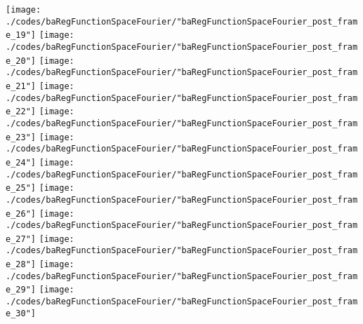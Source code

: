 \begin{frame}{\insertsection}
\begin{center}
{\begin{animateinline}{15}
				 \texttt{[image: ./codes/baRegFunctionSpaceFourier/"baRegFunctionSpaceFourier\_post\_frame\_19"]}\newframe
				 \texttt{[image: ./codes/baRegFunctionSpaceFourier/"baRegFunctionSpaceFourier\_post\_frame\_20"]}\newframe
				 \texttt{[image: ./codes/baRegFunctionSpaceFourier/"baRegFunctionSpaceFourier\_post\_frame\_21"]}\newframe
				 \texttt{[image: ./codes/baRegFunctionSpaceFourier/"baRegFunctionSpaceFourier\_post\_frame\_22"]}\newframe
				 \texttt{[image: ./codes/baRegFunctionSpaceFourier/"baRegFunctionSpaceFourier\_post\_frame\_23"]}\newframe
				 \texttt{[image: ./codes/baRegFunctionSpaceFourier/"baRegFunctionSpaceFourier\_post\_frame\_24"]}\newframe
				 \texttt{[image: ./codes/baRegFunctionSpaceFourier/"baRegFunctionSpaceFourier\_post\_frame\_25"]}\newframe
				 \texttt{[image: ./codes/baRegFunctionSpaceFourier/"baRegFunctionSpaceFourier\_post\_frame\_26"]}\newframe
				 \texttt{[image: ./codes/baRegFunctionSpaceFourier/"baRegFunctionSpaceFourier\_post\_frame\_27"]}\newframe
				 \texttt{[image: ./codes/baRegFunctionSpaceFourier/"baRegFunctionSpaceFourier\_post\_frame\_28"]}\newframe
				 \texttt{[image: ./codes/baRegFunctionSpaceFourier/"baRegFunctionSpaceFourier\_post\_frame\_29"]}\newframe
				 \texttt{[image: ./codes/baRegFunctionSpaceFourier/"baRegFunctionSpaceFourier\_post\_frame\_30"]}
			 \end{animateinline}
			}
	\end{center}
    
\end{frame}


